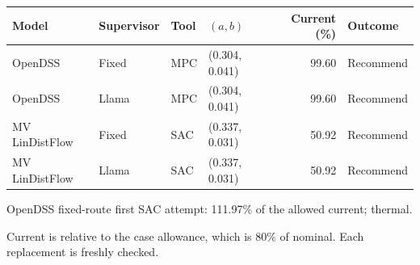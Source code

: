 \begin{tabular}{@{}llllrl@{}}
\toprule Model & Supervisor & Tool & $(a,b)$ & Current (\%) & Outcome\\
\midrule
OpenDSS & Fixed & MPC & (0.304, 0.041) & 99.60 & Recommend\\
OpenDSS & Llama & MPC & (0.304, 0.041) & 99.60 & Recommend\\
MV LinDistFlow & Fixed & SAC & (0.337, 0.031) & 50.92 & Recommend\\
MV LinDistFlow & Llama & SAC & (0.337, 0.031) & 50.92 & Recommend\\
\bottomrule
\end{tabular}
\par\medskip
OpenDSS fixed-route first SAC attempt: 111.97\% of the allowed current; thermal.\par
Current is relative to the case allowance, which is 80\% of nominal. Each replacement is freshly checked.